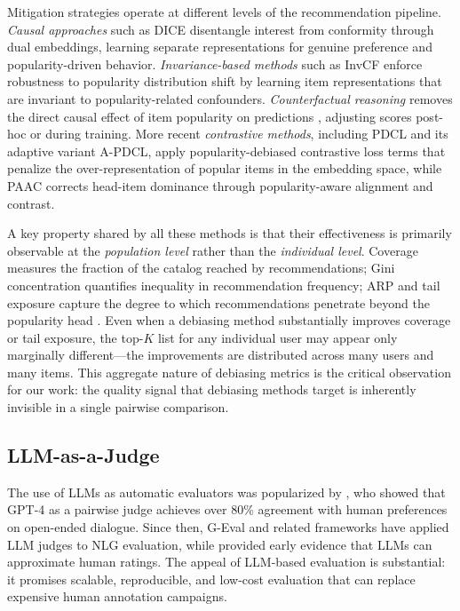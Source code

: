 \documentclass[pdflatex,sn-basic,referee,lineno]{sn-jnl}
\begin{document}
Mitigation strategies operate at different levels of the recommendation pipeline. \emph{Causal approaches} such as DICE \citep{zheng2021disentangling} disentangle interest from conformity through dual embeddings, learning separate representations for genuine preference and popularity-driven behavior. \emph{Invariance-based methods} such as InvCF \citep{zhang2023invariant} enforce robustness to popularity distribution shift by learning item representations that are invariant to popularity-related confounders. \emph{Counterfactual reasoning} removes the direct causal effect of item popularity on predictions \citep{wei2021model}, adjusting scores post-hoc or during training. More recent \emph{contrastive methods}, including PDCL and its adaptive variant A-PDCL, apply popularity-debiased contrastive loss terms that penalize the over-representation of popular items in the embedding space, while PAAC \citep{cai2024paac} corrects head-item dominance through popularity-aware alignment and contrast.

A key property shared by all these methods is that their effectiveness is primarily observable at the \emph{population level} rather than the \emph{individual level}. Coverage measures the fraction of the catalog reached by recommendations; Gini concentration quantifies inequality in recommendation frequency; ARP and tail exposure capture the degree to which recommendations penetrate beyond the popularity head \citep{ge2010beyond,kaminskas2016diversity}. Even when a debiasing method substantially improves coverage or tail exposure, the top-$K$ list for any individual user may appear only marginally different---the improvements are distributed across many users and many items. This aggregate nature of debiasing metrics is the critical observation for our work: the quality signal that debiasing methods target is inherently invisible in a single pairwise comparison.

\subsection{LLM-as-a-Judge}

The use of LLMs as automatic evaluators was popularized by \citet{zheng2023judging}, who showed that GPT-4 as a pairwise judge achieves over 80\% agreement with human preferences on open-ended dialogue. Since then, G-Eval \citep{liu2023geval} and related frameworks have applied LLM judges to NLG evaluation, while \citet{chiang2023can} provided early evidence that LLMs can approximate human ratings. The appeal of LLM-based evaluation is substantial: it promises scalable, reproducible, and low-cost evaluation that can replace expensive human annotation campaigns.
\end{document}
